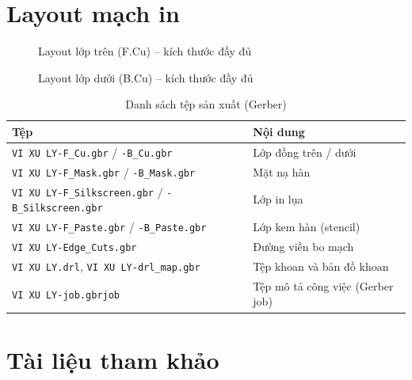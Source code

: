 \chapter{Layout mạch in}
\label{app:layout}

\begin{figure}[H]
\centering
{}
\caption{Layout lớp trên (F.Cu) -- kích thước đầy đủ}
\end{figure}

\begin{figure}[H]
\centering
{}
\caption{Layout lớp dưới (B.Cu) -- kích thước đầy đủ}
\end{figure}

\begin{table}[H]
\centering\small
\caption{Danh sách tệp sản xuất (Gerber)}
\begin{tabular}{@{}ll@{}}
\toprule
\textbf{Tệp} & \textbf{Nội dung}\\
\midrule
\texttt{VI XU LY-F\_Cu.gbr} / \texttt{-B\_Cu.gbr} & Lớp đồng trên / dưới\\
\texttt{VI XU LY-F\_Mask.gbr} / \texttt{-B\_Mask.gbr} & Mặt nạ hàn\\
\texttt{VI XU LY-F\_Silkscreen.gbr} / \texttt{-B\_Silkscreen.gbr} & Lớp in lụa\\
\texttt{VI XU LY-F\_Paste.gbr} / \texttt{-B\_Paste.gbr} & Lớp kem hàn (stencil)\\
\texttt{VI XU LY-Edge\_Cuts.gbr} & Đường viền bo mạch\\
\texttt{VI XU LY.drl}, \texttt{VI XU LY-drl\_map.gbr} & Tệp khoan và bản đồ khoan\\
\texttt{VI XU LY-job.gbrjob} & Tệp mô tả công việc (Gerber job)\\
\bottomrule
\end{tabular}
\end{table}

\chapter{Tài liệu tham khảo}
\label{app:docs}

